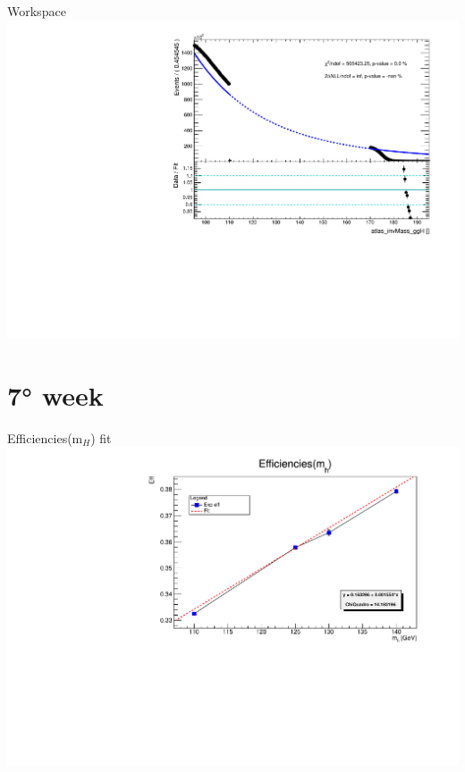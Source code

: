 \documentclass[10pt,UKenglish, leqno, xcolor = dvipsnames]{beamer}
\begin{document}
		\begin{frame}{Workspace}
			\vfill
			\includegraphics[width=1.\textwidth]{../images/ggHyy_efxsbr.pdf}
			\vfill
		\end{frame}
	
	\section{7° week}
	\SectionPage
	
		\begin{frame}{Efficiencies(m$_H$) fit}
			\vfill
			\includegraphics[width=1.\textwidth]{../images/efficiencies_fit_1.pdf}
			\vfill
		\end{frame}
	
\end{document}
